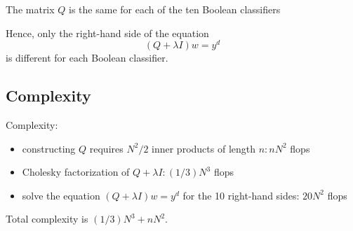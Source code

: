 The matrix $ Q $ is the same for each of the ten Boolean classifiers

Hence, only the right-hand side of the equation
\begin{equation}
(Q+\lambda I) w=y^{{d}}
\end{equation}
is different for each Boolean classifier.

\subsection{Complexity}

Complexity:

\begin{itemize}
    \item constructing $ Q $ requires $ N^{2} / 2 $ inner products of length $ n: n N^{2} $ flops
    \item Cholesky factorization of $ Q+\lambda I:(1 / 3) N^{3} $ flops
    \item solve the equation $ (Q+\lambda I) w=y^{{d}} $ for the 10 right-hand sides: $ 20 N^{2} $ flops
\end{itemize}

Total complexity is $ (1 / 3) N^{3}+n N^{2} $.

